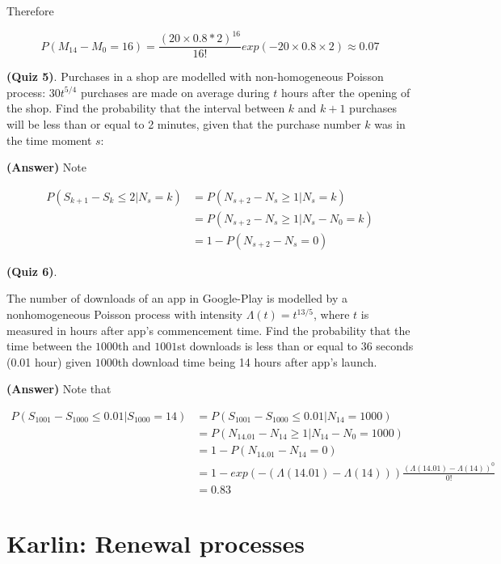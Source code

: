 \documentclass[12pt]{article}
\theoremstyle{nonumberbreak}
\begin{document}
Therefore

$$
P (M_{14} - M_0 = 16) = \frac{(20\times 0.8 * 2)^{16}}{16!} exp(-20\times0.8\times2) \approx 0.07
$$



\textbf{(Quiz 5)}. Purchases in a shop are modelled with non-homogeneous Poisson process: $30t^{5/4}$ purchases are made on average during $t$ hours after the opening of the shop. Find the probability that the interval between $k$ and $k+1$ purchases will be less than or equal to 2 minutes, given that the purchase number $k$ was in the time moment $s$:

\textbf{(Answer)} Note


$$
\begin{aligned}
P(S_{k+1} - S_k \le 2 | N_s = k) &= P(N_{s+2} - N_s \ge 1| N_s = k) \\[8pt]
&= P(N_{s+2} - N_s \ge 1 | N_s - N_0 = k) \\[8pt]
&= 1 - P(N_{s+2} - N_s = 0)
\end{aligned}
$$


\textbf{(Quiz 6)}. 

The number of downloads of an app in Google-Play is modelled by a nonhomogeneous Poisson process with intensity $\Lambda(t)=t^{13/5}$, where $t$ is measured in hours after app's commencement time. Find the probability that the time between the $1000$th and $1001$st downloads is less than or equal to $36$ seconds (0.01 hour) given $1000$th download time being 14 hours after app's launch.


\textbf{(Answer)} Note that

$$
\begin{aligned}
P(S_{1001} - S_{1000} \le 0.01 | S_{1000} = 14) &= P(S_{1001} - S_{1000} \le 0.01 | N_{14} = 1000) \\[8pt]
&= P( N_{14.01} - N_{14} \ge 1 | N_{14} - N_0 = 1000) \\[8pt]
&= 1- P( N_{14.01} - N_{14} = 0 ) \\[8pt]
&= 1- exp(-(\Lambda(14.01) - \Lambda(14)) ) \frac{(\Lambda(14.01) - \Lambda(14))^0}{0!} \\[8pt]
&= 0.83
\end{aligned}
$$





\pagebreak
\section*{Karlin: Renewal processes}
\setcounter{section}{0}
\end{document}
